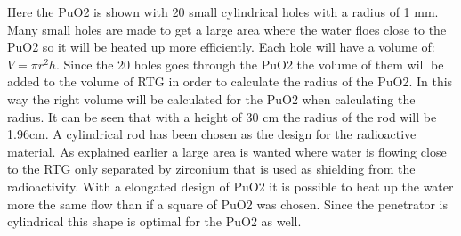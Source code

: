 Here the PuO2 is shown with 20 small cylindrical holes with a radius of 1 mm. Many small holes are made to get a large area where the water floes close to the PuO2 so it will be heated up more efficiently. Each hole will have a volume of: $V = \pi r^2 h$. Since the 20 holes goes through the PuO2 the volume of them will be added to the volume of RTG in order to calculate the radius of the PuO2. In this way the right volume will be calculated for the PuO2 when calculating the radius. It can be seen that with a height of 30 cm the radius of the rod will be 1.96cm.  A cylindrical rod has been chosen as the design for the radioactive material. As explained earlier a large area is wanted where water is flowing close to the RTG only separated by zirconium that is used as shielding from the radioactivity. With a elongated design of PuO2 it is possible to heat up the water more the same flow than if a square of PuO2 was chosen. Since the penetrator is cylindrical this shape is optimal for the PuO2 as well. 

